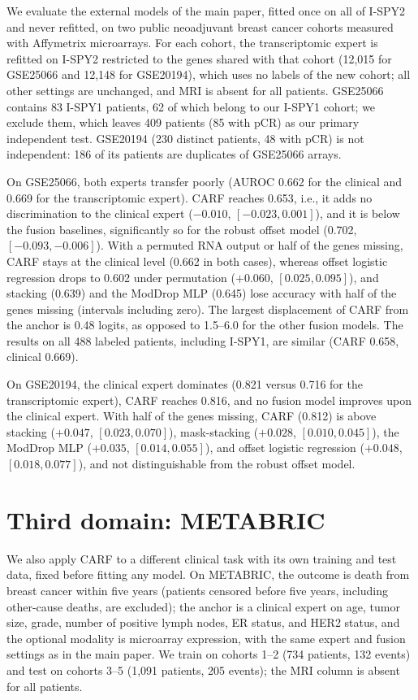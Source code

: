 \documentclass[runningheads]{llncs}
\begin{document}
We evaluate the external models of the main paper, fitted once on all of I-SPY2 and never refitted, on two public neoadjuvant breast cancer cohorts measured with Affymetrix microarrays. For each cohort, the transcriptomic expert is refitted on I-SPY2 restricted to the genes shared with that cohort (12{,}015 for GSE25066 and 12{,}148 for GSE20194), which uses no labels of the new cohort; all other settings are unchanged, and MRI is absent for all patients. GSE25066 contains 83 I-SPY1 patients, 62 of which belong to our I-SPY1 cohort; we exclude them, which leaves 409 patients (85 with pCR) as our primary independent test. GSE20194 (230 distinct patients, 48 with pCR) is not independent: 186 of its patients are duplicates of GSE25066 arrays.

On GSE25066, both experts transfer poorly (AUROC 0.662 for the clinical and 0.669 for the transcriptomic expert). CARF reaches 0.653, i.e., it adds no discrimination to the clinical expert ($-0.010$, $[-0.023,0.001]$), and it is below the fusion baselines, significantly so for the robust offset model (0.702, $[-0.093,-0.006]$). With a permuted RNA output or half of the genes missing, CARF stays at the clinical level (0.662 in both cases), whereas offset logistic regression drops to 0.602 under permutation ($+0.060$, $[0.025,0.095]$), and stacking (0.639) and the ModDrop MLP (0.645) lose accuracy with half of the genes missing (intervals including zero). The largest displacement of CARF from the anchor is 0.48 logits, as opposed to 1.5--6.0 for the other fusion models. The results on all 488 labeled patients, including I-SPY1, are similar (CARF 0.658, clinical 0.669).

On GSE20194, the clinical expert dominates (0.821 versus 0.716 for the transcriptomic expert), CARF reaches 0.816, and no fusion model improves upon the clinical expert. With half of the genes missing, CARF (0.812) is above stacking ($+0.047$, $[0.023,0.070]$), mask-stacking ($+0.028$, $[0.010,0.045]$), the ModDrop MLP ($+0.035$, $[0.014,0.055]$), and offset logistic regression ($+0.048$, $[0.018,0.077]$), and not distinguishable from the robust offset model.

\section{Third domain: METABRIC}

We also apply CARF to a different clinical task with its own training and test data, fixed before fitting any model. On METABRIC, the outcome is death from breast cancer within five years (patients censored before five years, including other-cause deaths, are excluded); the anchor is a clinical expert on age, tumor size, grade, number of positive lymph nodes, ER status, and HER2 status, and the optional modality is microarray expression, with the same expert and fusion settings as in the main paper. We train on cohorts 1--2 (734 patients, 132 events) and test on cohorts 3--5 (1{,}091 patients, 205 events); the MRI column is absent for all patients.
\end{document}
